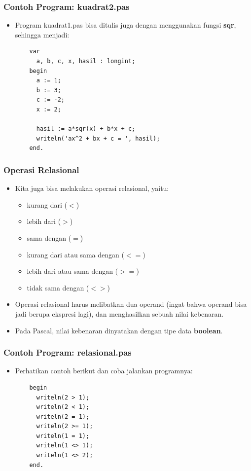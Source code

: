 \documentclass{beamer}
\begin{document}
\begin{frame}[fragile]
\frametitle{Contoh Program: kuadrat2.pas}
\begin{itemize}
  \item Program kuadrat1.pas bisa ditulis juga dengan menggunakan fungsi \textbf{sqr}, sehingga menjadi:
  \begin{lstlisting}
    var
      a, b, c, x, hasil : longint;
    begin
      a := 1;
      b := 3;
      c := -2;
      x := 2;

      hasil := a*sqr(x) + b*x + c;
      writeln('ax^2 + bx + c = ', hasil);
    end.
  \end{lstlisting}
\end{itemize}
\end{frame}

\begin{frame}
\frametitle{Operasi Relasional}
\begin{itemize}
  \item Kita juga bisa melakukan operasi relasional, yaitu:
  \begin{itemize}
    \item kurang dari ($<$)
    \item lebih dari ($>$)
    \item sama dengan ($=$)
    \item kurang dari atau sama dengan ($<=$)
    \item lebih dari atau sama dengan ($>=$)
    \item tidak sama dengan ($<>$)
  \end{itemize}
  \item Operasi relasional harus melibatkan dua operand (ingat bahwa operand bisa jadi berupa ekspresi lagi), dan menghasilkan sebuah nilai kebenaran.
  \item Pada Pascal, nilai kebenaran dinyatakan dengan tipe data \alert{\textbf{boolean}}.
\end{itemize}
\end{frame}

\begin{frame}[fragile]
\frametitle{Contoh Program: relasional.pas}
\begin{itemize}
  \item Perhatikan contoh berikut dan coba jalankan programnya:
  \begin{lstlisting}
    begin
      writeln(2 > 1);
      writeln(2 < 1);
      writeln(2 = 1);
      writeln(2 >= 1);
      writeln(1 = 1);
      writeln(1 <> 1);
      writeln(1 <> 2);
    end.
  \end{lstlisting}
\end{itemize}
\end{frame}
\end{document}
